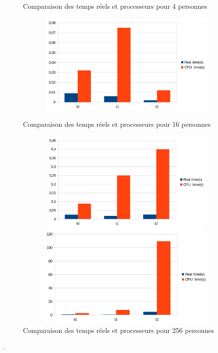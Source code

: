 \documentclass[11pt]{article} %
\begin{document}
\begin{figure}[!h]
  \centering
\caption{Comparaison des temps réels et processeurs pour 4 personnes}

\includegraphics[width=12cm, height=5cm]{p4}

 \caption{Comparaison des temps réels et processeurs pour 16 personnes}

\includegraphics[width=12cm,height=5cm]{p16}

 \caption{Comparaison des temps réels et processeurs pour 256 personnes}

\includegraphics[width=12cm,height=5cm]{p256}
\end{figure}

\newpage
.
\newpage
\end{document}
